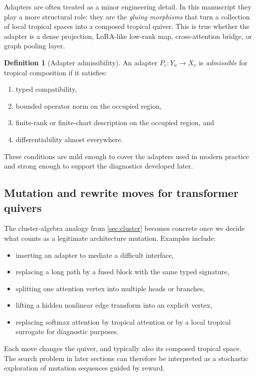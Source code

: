 \documentclass[11pt]{article}
\theoremstyle{definition}
\newtheorem{definition}{Definition}[section]
\theoremstyle{plain}
\theoremstyle{remark}
\begin{document}
Adapters are often treated as a minor engineering detail.
In this manuscript they play a more structural role:
they are the \emph{gluing morphisms} that turn a collection of local tropical spaces into a composed tropical quiver.
This is true whether the adapter is a dense projection, LoRA-like low-rank map, cross-attention bridge, or graph pooling layer.

\begin{definition}[Adapter admissibility]
An adapter $P_e:Y_u\to X_v$ is \emph{admissible} for tropical composition if it satisfies:
\begin{enumerate}[leftmargin=2em]
\item typed compatibility,
\item bounded operator norm on the occupied region,
\item finite-rank or finite-chart description on the occupied region, and
\item differentiability almost everywhere.
\end{enumerate}
\end{definition}

These conditions are mild enough to cover the adapters used in modern practice and strong enough to support the diagnostics developed later.

\subsection{Mutation and rewrite moves for transformer quivers}
\label{sec:transformer-mutations}

The cluster-algebra analogy from \cref{sec:cluster} becomes concrete once we decide what counts as a legitimate architecture mutation.
Examples include:
\begin{itemize}[leftmargin=2em]
\item inserting an adapter to mediate a difficult interface,
\item replacing a long path by a fused block with the same typed signature,
\item splitting one attention vertex into multiple heads or branches,
\item lifting a hidden nonlinear edge transform into an explicit vertex,
\item replacing softmax attention by tropical attention or by a local tropical surrogate for diagnostic purposes.
\end{itemize}
Each move changes the quiver, and typically also its composed tropical space.
The search problem in later sections can therefore be interpreted as a stochastic exploration of mutation sequences guided by reward.
\end{document}
